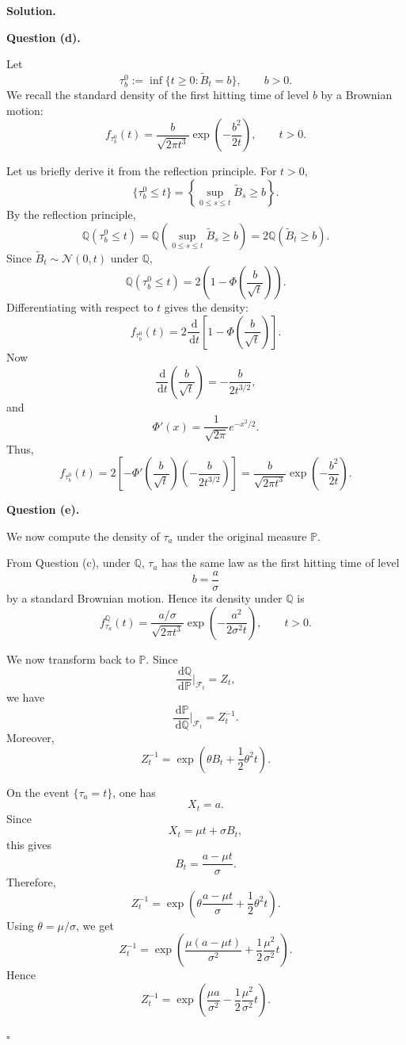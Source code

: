 \documentclass[11pt]{article}
\theoremstyle{plain}
\newcommand{\dd}{\,\mathrm{d}}
\newcommand{\1}{\mathbf{1}}
\theoremstyle{definition}
\newenvironment{solution}
{\par\medskip\noindent\textbf{Solution.}\par\medskip}
{\hfill$\square$\par\medskip}
\newenvironment{solutionpart}[1]
{\par\medskip\noindent\textbf{#1.}\par\smallskip}
{\par\medskip}
\begin{document}
\begin{solution}
\begin{solutionpart}{Question (d)}
Let
\[
\tau_b^0:=\inf\{t\ge0:\widetilde B_t=b\},
\qquad b>0.
\]
We recall the standard density of the first hitting time of level $b$ by a Brownian motion:
\[
f_{\tau_b^0}(t)
=
\frac{b}{\sqrt{2\pi t^3}}
\exp\left(-\frac{b^2}{2t}\right),
\qquad t>0.
\]

Let us briefly derive it from the reflection principle. For $t>0$,
\[
\{\tau_b^0\le t\}
=
\left\{\sup_{0\le s\le t}\widetilde B_s\ge b\right\}.
\]
By the reflection principle,
\[
\mathbb{Q}(\tau_b^0\le t)
=
\mathbb{Q}\left(\sup_{0\le s\le t}\widetilde B_s\ge b\right)
=
2\mathbb{Q}(\widetilde B_t\ge b).
\]
Since $\widetilde B_t\sim \mathcal{N}(0,t)$ under $\mathbb{Q}$,
\[
\mathbb{Q}(\tau_b^0\le t)
=
2\left(1-\Phi\left(\frac{b}{\sqrt t}\right)\right).
\]
Differentiating with respect to $t$ gives the density:
\[
f_{\tau_b^0}(t)
=
2\frac{\dd}{\dd t}
\left[
1-\Phi\left(\frac{b}{\sqrt t}\right)
\right].
\]
Now
\[
\frac{\dd}{\dd t}\left(\frac{b}{\sqrt t}\right)
=
-\frac{b}{2t^{3/2}},
\]
and
\[
\Phi'(x)=\frac{1}{\sqrt{2\pi}}e^{-x^2/2}.
\]
Thus,
\[
f_{\tau_b^0}(t)
=
2
\left[
-\Phi'\left(\frac{b}{\sqrt t}\right)
\left(-\frac{b}{2t^{3/2}}\right)
\right]
=
\frac{b}{\sqrt{2\pi t^3}}
\exp\left(-\frac{b^2}{2t}\right).
\]
\end{solutionpart}

\begin{solutionpart}{Question (e)}
We now compute the density of $\tau_a$ under the original measure $\mathbb{P}$.

From Question (c), under $\mathbb{Q}$, $\tau_a$ has the same law as the first hitting time of level
\[
b=\frac{a}{\sigma}
\]
by a standard Brownian motion. Hence its density under $\mathbb{Q}$ is
\[
f_{\tau_a}^{\mathbb{Q}}(t)
=
\frac{a/\sigma}{\sqrt{2\pi t^3}}
\exp\left(-\frac{a^2}{2\sigma^2t}\right),
\qquad t>0.
\]

We now transform back to $\mathbb{P}$. Since
\[
\frac{\dd\mathbb{Q}}{\dd\mathbb{P}}\Big|_{\mathcal{F}_t}
=
Z_t,
\]
we have
\[
\frac{\dd\mathbb{P}}{\dd\mathbb{Q}}\Big|_{\mathcal{F}_t}
=
Z_t^{-1}.
\]
Moreover,
\[
Z_t^{-1}
=
\exp\left(\theta B_t+\frac12\theta^2t\right).
\]

On the event $\{\tau_a=t\}$, one has
\[
X_t=a.
\]
Since
\[
X_t=\mu t+\sigma B_t,
\]
this gives
\[
B_t=\frac{a-\mu t}{\sigma}.
\]
Therefore,
\[
Z_t^{-1}
=
\exp\left(
\theta\frac{a-\mu t}{\sigma}
+
\frac12\theta^2t
\right).
\]
Using $\theta=\mu/\sigma$, we get
\[
Z_t^{-1}
=
\exp\left(
\frac{\mu(a-\mu t)}{\sigma^2}
+
\frac12\frac{\mu^2}{\sigma^2}t
\right).
\]
Hence
\[
Z_t^{-1}
=
\exp\left(
\frac{\mu a}{\sigma^2}
-
\frac12\frac{\mu^2}{\sigma^2}t
\right).
\]


\end{solutionpart}
\end{solution}
\end{document}
